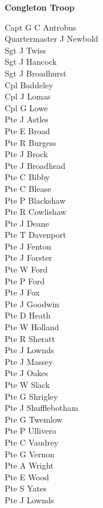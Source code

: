 \pagebreak

\begin{center}
  \Large
  \textbf{Congleton Troop}
\end{center}

\begin{multicols}{3}
  \small
  \noindent
  Capt G C Antrobus \\
  Quartermaster J Newbold \\
  Sgt J Twiss \\
  Sgt J Hancock \\
  Sgt J Broadhurst \\
  Cpl Baddeley \\
  Cpl J Lomas \\
  Cpl G Lowe \\
  Pte J Astles \\
  Pte E Broad \\
  Pte R Burgess \\
  Pte J Brock \\
  Pte J Broadhead \\
  Pte C Bibby \\
  Pte C Blease \\
  Pte P Blackshaw \\
  Pte R Cowlishaw \\
  Pte J Deane \\
  Pte T Davenport \\
  Pte J Fenton \\
  Pte J Forster \\
  Pte W Ford \\
  Pte P Ford \\
  Pte J Fox \\
  Pte J Goodwin \\
  Pte D Heath \\
  Pte W Holland \\
  Pte R Sheratt \\
  Pte J Lownds \\
  Pte J Massey \\
  Pte J Oakes \\
  Pte W Slack \\
  Pte G Shrigley \\
  Pte J Shufflebotham \\
  Pte G Twemlow \\
  Pte P Ullivero \\
  Pte C Vaudrey \\
  Pte G Vernon \\
  Pte A Wright \\
  Pte E Wood \\
  Pte S Yates \\
  Pte J Lownds \\
\end{multicols}

